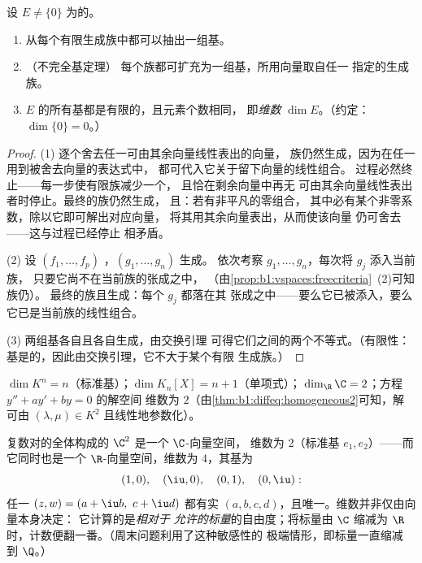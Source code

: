 \begin{theorem}[有限维中的基]\label{thm:b1:findim:bases}
设 $E \neq \{0\}$ 为的。
\begin{enumerate}
  \item 从每个有限生成族中都可以抽出一组基。
  \item （不完全基定理）
        每个族都可扩充为一组基，所用向量取自任一
        指定的生成族。
  \item $E$ 的所有基都是有限的，且元素个数相同，
        即\emph{维数} $\dim E$。（约定：
        $\dim\{0\} = 0$。）
\end{enumerate}
\end{theorem}

\begin{proof}
(1) 逐个舍去任一可由其余向量线性表出的向量，
族仍然生成，因为在任一用到被舍去向量的表达式中，
都可代入它关于留下向量的线性组合。
过程必然终止——每一步使有限族减少一个，
且恰在剩余向量中再无
可由其余向量线性表出者时停止。最终的族仍然生成，
且：若有非平凡的零组合，
其中必有某个非零系数，除以它即可解出对应向量，
将其用其余向量表出，从而使该向量
仍可舍去——这与过程已经停止
相矛盾。

(2) 设 $(f_1, \dots, f_p)$ ，$(g_1, \dots, g_n)$ 生成。
依次考察 $g_1, \dots, g_n$，每次将 $g_j$ 添入当前族，
只要它尚不在当前族的张成之中，
（由\cref{prop:b1:vspaces:freecriteria}~(2)可知族仍）。
最终的族且生成：每个 $g_j$ 都落在其
张成之中——要么它已被添入，要么它已是当前族的线性组合。

(3) 两组基各自且各自生成，由交换引理
可得它们之间的两个不等式。（有限性：
基是的，因此由交换引理，它不大于某个有限
生成族。）
\end{proof}

\begin{example}\label{ex:b1:findim:dims}
$\dim K^n = n$（标准基）；$\dim K_n[X] = n + 1$（单项式）；
$\dim_\R \C = 2$；方程 $y'' + ay' + by = 0$ 的解空间
维数为 $2$（由\cref{thm:b1:diffeq:homogeneous2}可知，解
可由 $(\lambda, \mu) \in K^2$ 且线性地参数化）。
\end{example}

\begin{example}
\label{ex:b1:findim:twodimensions}
复数对的全体构成的 $\C^2$ 是一个 $\C$-向量空间，
维数为 $2$（标准基 $e_1, e_2$）——而它同时也是一个
$\R$-向量空间，维数为 $4$，其基为
\[
(1, 0),\quad (\iu, 0),\quad (0, 1),\quad (0, \iu):
\]
任一 $(z, w) = (a + \iu b,\ c + \iu d)$ 都有实
$(a, b, c, d)$，且唯一。维数并非仅由向量本身决定：
它计算的是\emph{相对于
允许的标量}的自由度；将标量由 $\C$
缩减为 $\R$ 时，计数便翻一番。（周末问题利用了这种敏感性的
极端情形，即标量一直缩减
到 $\Q$。）
\end{example}

